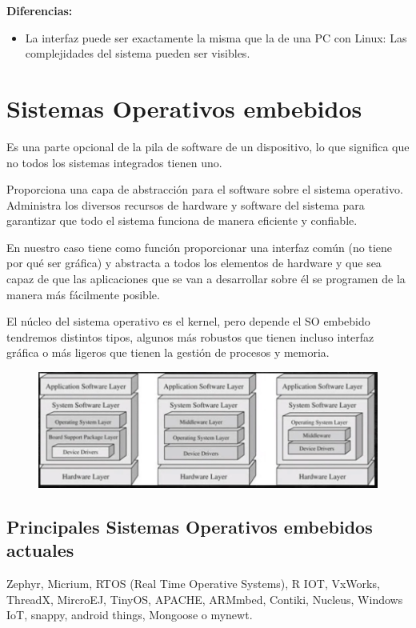 \documentclass[12pt, twoside, openright]{report} %
\begin{document}
\textbf{Diferencias:}
\begin{itemize}
	\item La interfaz puede ser exactamente la misma que la de una PC con Linux: Las complejidades del sistema pueden ser visibles.
\end{itemize}

\section{Sistemas Operativos embebidos}
Es una parte opcional de la pila de software de un dispositivo, lo que significa que no todos los sistemas integrados tienen uno.

Proporciona una capa de abstracción para el software sobre el sistema operativo.
Administra los diversos recursos de hardware y software del sistema para garantizar que todo el sistema funciona de manera eficiente y confiable.

En nuestro caso tiene como función proporcionar una interfaz común (no tiene por qué ser gráfica) y abstracta a todos los elementos de hardware y que sea capaz de que las aplicaciones que se van a desarrollar sobre él se programen de la manera más fácilmente posible.

El núcleo del sistema operativo es el kernel, pero depende el SO embebido tendremos distintos tipos, algunos más robustos que tienen incluso interfaz gráfica o más ligeros que tienen la gestión de procesos y memoria.

\begin{figure}[H]
	{\includegraphics[scale=.6]{2021-03-25 09_19_18-2021-03-24 16-59-20.mkv.png}}
\end{figure}

\subsection{Principales Sistemas Operativos embebidos actuales}
Zephyr, Micrium, RTOS (Real Time Operative Systems), R IOT, VxWorks, ThreadX, MircroEJ, TinyOS, APACHE, ARMmbed, Contiki, Nucleus, Windows IoT, snappy, android things, Mongoose o mynewt.
\end{document}

